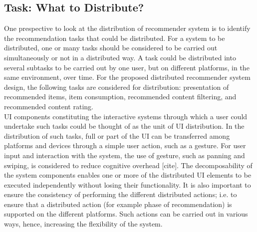 \subsection{Task: What to Distribute?} 
One prespective to look at the distribution of recommender system is to identify the recommendation tasks that could be distributed. For a system to be distributed, one or many tasks should be considered to be carried out simultaneously or not in a distributed way. A task could be distributed into several subtasks to be carried out by one user, but on different platforms, in the same environment, over time. 
For the proposed distributed recommender system design, the following tasks are considered for distribution: presentation of recommended items, item consumption, recommended content filtering, and recommended content rating.\\ 
UI components constituting the interactive systems through which a user could undertake such tasks could be thought of as the unit of UI distribution. In the distribution of such tasks, full or part of the UI can be transferred among platforms and devices through a simple user action, such as a gesture. For user input and interaction with the system, the use of gesture, such as panning and swiping, is considered to reduce cognitive overhead [cite]. The decomposability of the system components enables one or more of the distributed UI elements to be executed independently without losing their functionality. It is also important to ensure the consistency of performing the different distributed actions; i.e. to ensure that a distributed action (for example phase of recommendation) is supported on the different platforms. Such actions can be carried out in various ways, hence, increasing the flexibility of the system. \\

